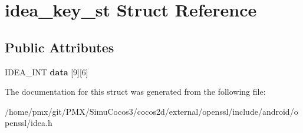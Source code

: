 \hypertarget{structidea__key__st}{}\section{idea\+\_\+key\+\_\+st Struct Reference}
\label{structidea__key__st}
\subsection*{Public Attributes}
\begin{DoxyCompactItemize}
\item 
\mbox{\label{structidea__key__st_ae096eb14e37c7e1efef4d73fb3021426}} 
I\+D\+E\+A\+\_\+\+I\+NT {\bfseries data} \mbox{[}9\mbox{]}\mbox{[}6\mbox{]}
\end{DoxyCompactItemize}


The documentation for this struct was generated from the following file\+:\begin{DoxyCompactItemize}
\item 
/home/pmx/git/\+P\+M\+X/\+Simu\+Cocos3/cocos2d/external/openssl/include/android/openssl/idea.\+h\end{DoxyCompactItemize}
